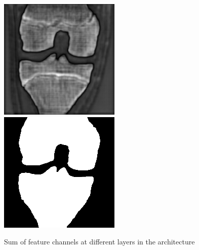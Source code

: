 \begin{figure}[H]
\endminipage\hfill
{}%
  \includegraphics[width=\linewidth]{imgs/up4.png}
\endminipage\hfill
{}%
  \includegraphics[width=\linewidth]{imgs/z_output.png}
\endminipage
\caption{Sum of feature channels at different layers in the architecture}
\end{figure}

